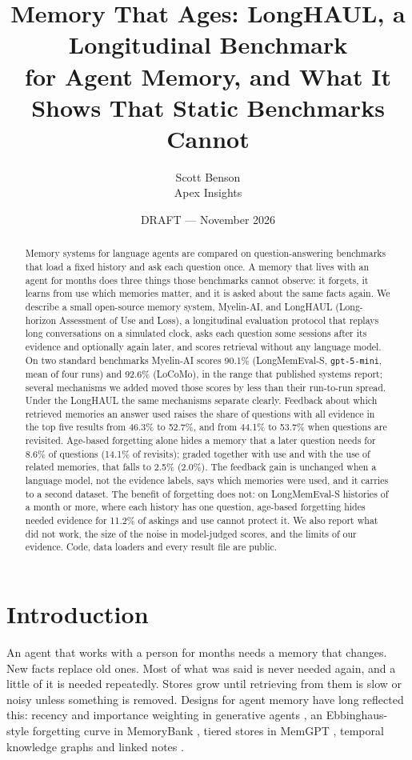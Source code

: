 \documentclass[11pt]{article}
\title{Memory That Ages: LongHAUL, a Longitudinal Benchmark\\ for Agent Memory,
and What It Shows That Static Benchmarks Cannot}
\author{Scott Benson\\Apex Insights}
\date{DRAFT --- November 2026}
\begin{document}
\maketitle

\begin{abstract}
Memory systems for language agents are compared on question-answering
benchmarks that load a fixed history and ask each question once. A
memory that lives with an agent for months does three things those
benchmarks cannot observe: it forgets, it learns from use which
memories matter, and it is asked about the same facts again. We
describe a small open-source memory system, \mbox{Myelin-AI}, and LongHAUL
(Long-horizon Assessment of Use and Loss), a longitudinal evaluation
protocol that replays long conversations on a simulated
clock, asks each question some sessions after its evidence and
optionally again later, and scores retrieval without any language
model. On two standard benchmarks \mbox{Myelin-AI} scores 90.1\% (LongMemEval-S,
\texttt{gpt-5-mini}, mean of four runs) and 92.6\% (LoCoMo), in the
range that published systems report; several mechanisms we added moved
those scores by less than their run-to-run spread. Under the
LongHAUL the same mechanisms separate clearly. Feedback
about which retrieved memories an answer used raises the share of
questions with all evidence in the top five results from 46.3\% to
52.7\%, and from 44.1\% to 53.7\% when questions are revisited.
Age-based forgetting alone hides a memory that a later question needs
for 8.6\% of questions (14.1\% of revisits); graded together with use
and with the use of related memories, that falls to 2.5\% (2.0\%).
The feedback gain is unchanged when a language model, not the evidence
labels, says which memories were used, and it carries to a second
dataset. The benefit of forgetting does not: on LongMemEval-S
histories of a month or more, where each history has one question,
age-based forgetting hides needed evidence for 11.2\% of askings and
use cannot protect it.
We also report what did not work, the size of the noise in
model-judged scores, and the limits of our evidence. Code, data
loaders and every result file are public.
\end{abstract}

\section{Introduction}

An agent that works with a person for months needs a memory that
changes. New facts replace old ones. Most of what was said is never
needed again, and a little of it is needed repeatedly. Stores grow
until retrieving from them is slow or noisy unless something is
removed. Designs for agent memory have long reflected this: recency and
importance weighting in generative agents \citep{park2023generative},
an Ebbinghaus-style forgetting curve in MemoryBank
\citep{zhong2024memorybank,ebbinghaus1885}, tiered stores in MemGPT
\citep{packer2023memgpt}, temporal knowledge graphs
\citep{rasmussen2025zep} and linked notes \citep{xu2025amem}.
\end{document}
